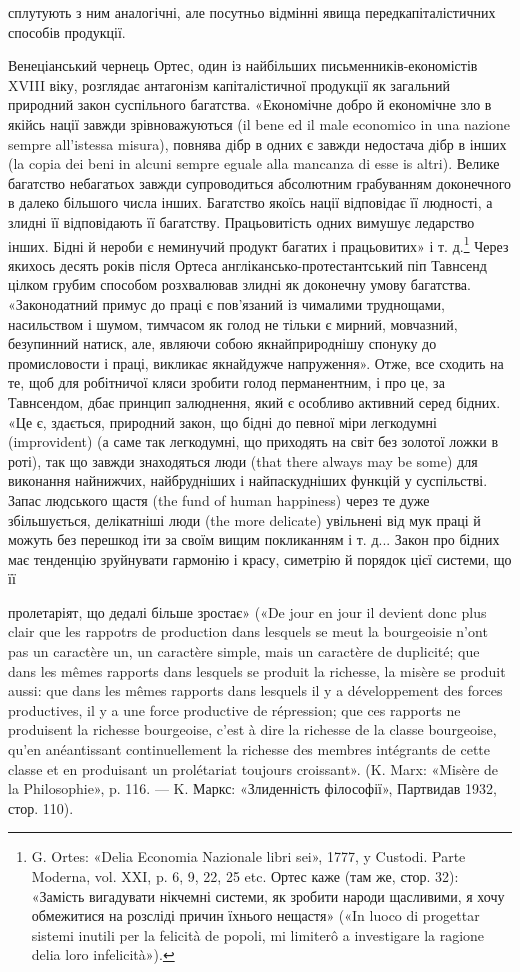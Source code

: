сплутують з ним аналогічні, але посутньо відмінні явища передкапіталістичних
способів продукції.

Венеціанський чернець Ортес, один із найбільших письменників-економістів
XVIII віку, розглядає антагонізм капіталістичної
продукції як загальний природний закон суспільного
багатства. «Економічне добро й економічне зло в якійсь нації
завжди зрівноважуються (il bene ed il male economico in una
nazione sempre all’istessa misura), повнява дібр в одних є завжди
недостача дібр в інших (la copia dei beni in alcuni sempre eguale
alla mancanza di esse is altri). Велике багатство небагатьох завжди
супроводиться абсолютним грабуванням доконечного в далеко
більшого числа інших. Багатство якоїсь нації відповідає її людності,
а злидні її відповідають її багатству. Працьовитість одних
вимушує ледарство інших. Бідні й нероби є неминучий продукт
багатих і працьовитих» і т. д.\footnote{
G. Ortes: «Delia Economia Nazionale libri sei», 1777, y Custodi.
Parte Moderna, vol. XXI, p. 6, 9, 22, 25 etc. Ортес каже (там же, стор. 32):
«Замість вигадувати нікчемні системи, як зробити народи щасливими,
я хочу обмежитися на розсліді причин їхнього нещастя» («In luoco di
progettar sistemi inutili per la felicità de popoli, mi limiterô a investigare
la ragione delia loro infelicità»).
} Через якихось десять років
після Ортеса англікансько-протестантський піп Тавнсенд цілком
грубим способом розхвалював злидні як доконечну умову
багатства. «Законодатний примус до праці є пов’язаний із чималими
труднощами, насильством і шумом, тимчасом як голод не
тільки є мирний, мовчазний, безупинний натиск, але, являючи
собою якнайприроднішу спонуку до промисловости і праці, викликає
якнайдужче напруження». Отже, все сходить на те, щоб
для робітничої кляси зробити голод перманентним, і про це, за
Тавнсендом, дбає принцип залюднення, який є особливо активний
серед бідних. «Це є, здається, природний закон, що бідні
до певної міри легкодумні (improvident) (а саме так легкодумні,
що приходять на світ без золотої ложки в роті), так що завжди
знаходяться люди (that there always may be some) для виконання
найнижчих, найбрудніших і найпаскудніших функцій у суспільстві.
Запас людського щастя (the fund of human happiness) через
те дуже збільшується, делікатніші люди (the more delicate) увільнені
від мук праці й можуть без перешкод іти за своїм вищим
покликанням і т. д... Закон про бідних має тенденцію зруйнувати
гармонію і красу, симетрію й порядок цієї системи, що її

пролетаріят, що дедалі більше зростає» («De jour en jour il devient donc
plus clair que les rappotrs de production dans lesquels se meut la bourgeoisie
n’ont pas un caractère un, un caractère simple, mais un caractère de duplicité;
que dans les mêmes rapports dans lesquels se produit la richesse, la
misère se produit aussi: que dans les mêmes rapports dans lesquels il y a
développement des forces productives, il y a une force productive de répression;
que ces rapports ne produisent la richesse bourgeoise, c’est à dire
la richesse de la classe bourgeoise, qu’en anéantissant continuellement la
richesse des membres intégrants de cette classe et en produisant un prolétariat
toujours croissant». (K. Marx: «Misère de la Philosophie», p. 116.
— K. Маркс: «Злиденність філософії», Партвидав 1932, стор. 110).